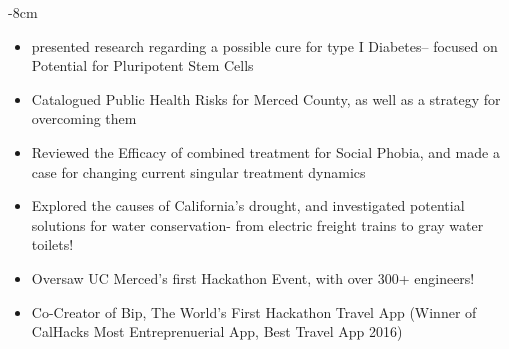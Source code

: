 \documentclass[10pt,a4paper]{altacv}
\begin{document}

\begin{adjustwidth}{}{-8cm}
\makecvheader
\end{adjustwidth}


\begin{itemize}
\item presented research regarding a possible cure for type I Diabetes-- focused on Potential for Pluripotent Stem Cells
\item Catalogued Public Health Risks for Merced County, as well as a strategy for overcoming them
\item Reviewed the Efficacy of combined treatment for Social Phobia, and made a case for changing current singular treatment dynamics
\item Explored the causes of California's drought, and investigated potential solutions for water conservation- from electric freight trains to gray water toilets!
\end{itemize}

\divider

\begin{itemize}
\item Oversaw UC Merced's first Hackathon Event, with over 300+ engineers!
\item Co-Creator of Bip, The World's First Hackathon Travel App (Winner of CalHacks Most Entreprenuerial App, Best Travel App 2016)
\end{itemize}
\end{document}
